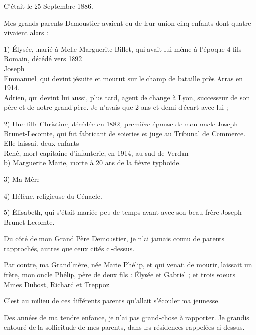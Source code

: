 \documentclass[11pt,a4paper]{report}
\begin{document}
C'était le 25 Septembre 1886.

Mes grands parents Demoustier avaient eu de leur union cinq enfants dont quatre vivaient alors :

1) Élysée, marié à Melle Marguerite Billet, qui avait lui-même à l'époque 4 fils \\ \hspace*{2em} Romain, décédé vers 1892 \\ \hspace*{2em} Joseph \\ \hspace*{2em} Emmanuel, qui devint jésuite et mourut sur le champ de bataille près Arras en 1914. \\ \hspace*{2em} Adrien, qui devint lui aussi, plus tard, agent de change à Lyon, successeur de son père et de notre grand'père. Je n'avais que 2 ans et demi d'écart avec lui ;

2) Une fille Christine, décédée en 1882, première épouse de mon oncle Joseph Brunet-Lecomte, qui fut fabricant de soieries et juge au Tribunal de Commerce. Elle laissait deux enfants \\ \hspace*{2em} René, mort capitaine d'infanterie, en 1914, au sud de Verdun \\ \hspace*{2em} b) Marguerite Marie, morte à 20 ans de la fièvre typhoïde.

3) Ma Mère

4) Hélène, religieuse du Cénacle.

5) Élisabeth, qui s'était mariée peu de temps avant avec son beau-frère Joseph Brunet-Lecomte.

Du côté de mon Grand Père Demoustier, je n'ai jamais connu de parents rapprochés, autres que ceux cités ci-dessus.

Par contre, ma Grand'mère, née Marie Phélip, et qui venait de mourir, laissait un frère, mon oncle Phélip, père de deux fils : Élysée et Gabriel ; et trois soeurs Mmes Dubost, Richard et Treppoz.

C'est au milieu de ces différents parents qu'allait s'écouler ma jeunesse.

Des années de ma tendre enfance, je n'ai pas grand-chose à rapporter. Je grandis entouré de la sollicitude de mes parents, dans les résidences rappelées ci-dessus.
\end{document}
